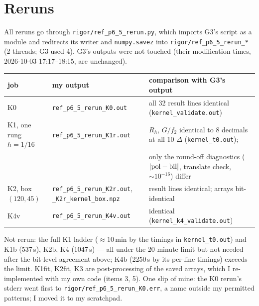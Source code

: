 \documentclass[11pt]{article}
\begin{document}
\section{Reruns}
All reruns go through \texttt{rigor/ref\_p6\_5\_rerun.py}, which imports G3's script as a module and redirects its writer and
\texttt{numpy.savez} into \texttt{rigor/ref\_p6\_5\_rerun\_*} (2 threads; G3 used 4). G3's outputs were not touched (their
modification times, 2026-10-03 17:17--18:15, are unchanged).
\begin{center}\small
\begin{tabular}{lll}\toprule
job & my output & comparison with G3's output\\\midrule
K0 & \texttt{ref\_p6\_5\_rerun\_K0.out} & all 32 result lines identical (\texttt{kernel\_validate.out})\\
K1, one rung $h=1/16$ & \texttt{ref\_p6\_5\_rerun\_K1r.out} & $R_h$, $G/f_2$ identical to 8 decimals at all 10 $\Delta$ (\texttt{kernel\_t0.out});\\
 & & only the round-off diagnostics ($|{\rm pol}-{\rm bil}|$, translate check, $\sim10^{-16}$) differ\\
K2, box $(120,45)$ & \texttt{ref\_p6\_5\_rerun\_K2r.out}, \texttt{\_K2r\_kernel\_box.npz} & result lines identical; arrays bit-identical\\
K4v & \texttt{ref\_p6\_5\_rerun\_K4v.out} & identical (\texttt{kernel\_k4\_validate.out})\\\bottomrule
\end{tabular}\end{center}
Not rerun: the full K1 ladder ($\approx10$\,min by the timings in \texttt{kernel\_t0.out}) and K1b (537\,s), K2b, K4 (1047\,s) ---
all under the 20-minute limit but not needed after the bit-level agreement above; K4b (2250\,s by its per-line timings) exceeds
the limit. K1fit, K2fit, K3 are post-processing of the saved arrays, which I re-implemented with my own code (items 3, 5). One
slip of mine: the K0 rerun's stderr went first to \texttt{rigor/ref\_p6\_5\_rerun\_K0.err}, a name outside my permitted
patterns; I moved it to my scratchpad.
\end{document}
